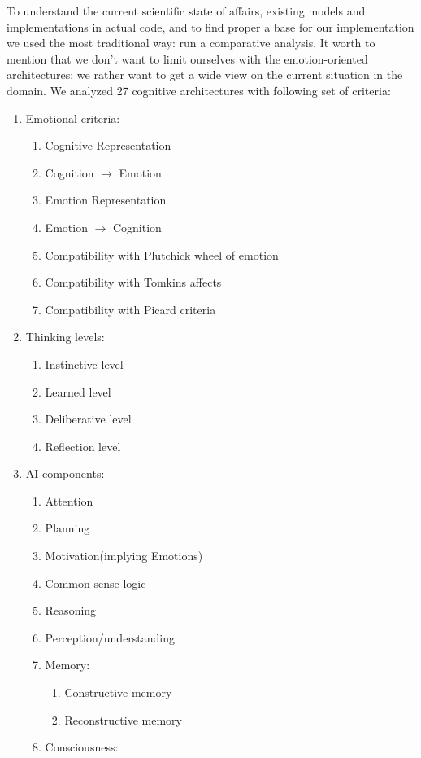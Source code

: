 To understand the current scientific state of affairs, existing models and implementations in actual code, and to find proper a base for our implementation we used the most traditional way: run a comparative analysis. It worth to mention that we don't want to limit ourselves with the emotion-oriented architectures; we rather want to get a wide view on the current situation in the domain. We analyzed 27 cognitive architectures with following set of criteria:

\begin{enumerate}
 \item  Emotional criteria:
 \begin{enumerate}
  \item  Cognitive Representation
  \item  Cognition $\rightarrow$ Emotion
  \item  Emotion Representation
  \item  Emotion $\rightarrow$ Cognition
  \item  Compatibility with Plutchick wheel of emotion
  \item  Compatibility with Tomkins affects
  \item  Compatibility with Picard criteria
 \end{enumerate}
 \item  Thinking levels:
 \begin{enumerate}
  \item  Instinctive level
  \item  Learned level
  \item  Deliberative level
  \item  Reflection level
 \end{enumerate}
 \item  AI components:
 \begin{enumerate}
  \item  Attention
  \item  Planning
  \item  Motivation(implying Emotions)
  \item  Common sense logic
  \item  Reasoning
  \item  Perception/understanding
  \item  Memory:
  \begin{enumerate}
   \item  Constructive memory
   \item  Reconstructive memory
  \end{enumerate}
  \item  Consciousness:

\end{enumerate}
\end{enumerate}
